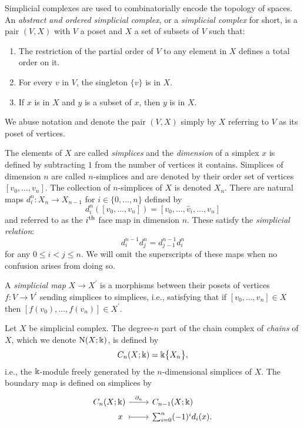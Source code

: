 Simplicial complexes are used to combinatorially encode the topology of spaces.
An \textit{abstract and ordered simplicial complex}, or a \textit{simplicial complex} for short, is a pair $(V, X)$ with $V$ a poset and $X$ a set of subsets of $V$ such that:
\begin{enumerate}
	\item The restriction of the partial order of $V$ to any element in $X$ defines a total order on it.
	\item For every $v$ in $V$, the singleton $\{v\}$ is in $X$.
	\item If $x$ is in $X$ and $y$ is a subset of $x$, then $y$ is in $X$.
\end{enumerate}
We abuse notation and denote the pair $(V, X)$ simply by $X$ referring to $V$ as its poset of vertices.

The elements of $X$ are called \textit{simplices} and the \textit{dimension} of a simplex $x$ is defined by subtracting $1$ from the number of vertices it contains.
Simplices of dimension $n$ are called $n$-simplices and are denoted by their order set of vertices $[v_0, \dots, v_n]$.
The collection of $n$-simplices of $X$ is denoted $X_n$.
There are natural maps $d_i^n \colon X_n \to X_{n-1}$ for $i \in \{0, \dots, n\}$ defined by
\begin{equation*}
d_i^n([v_0, \dots, v_n]) = [v_0, \dots, \widehat{v}_i, \dots, v_n]
\end{equation*}
and referred to as the $i^{\mathrm{th}}$ face map in dimension $n$.
These satisfy the \textit{simplicial relation}:
\begin{equation} \label{e:simplicial relation}
d_i^{n-1} d^n_j = d_{j-1}^{n-1} d_i^n
\end{equation}
for any $0 \leq i < j \leq n$.
We will omit the superscripts of these maps when no confusion arises from doing so.

A \textit{simplicial map} $X \to X^\prime$ is a morphisms between their posets of vertices $f \colon V \to V^\prime$ sending simplices to simplices, i.e., satisfying that if $[v_0, \dots, v_n] \in X$ then $[f(v_0), \dots, f(v_n)] \in X^\prime$.

Let $X$ be simplicial complex.
The degree-$n$ part of the chain complex of \textit{chains} of $X$, which we denote $\operatorname{N}(X; \Bbbk)$, is defined by
\begin{equation*}
C_n(X; \Bbbk) = \Bbbk \big\{ X_n \big\},
\end{equation*}
i.e., the $\Bbbk$-module freely generated by the $n$-dimensional simplices of $X$.
The boundary map is defined on simplices by
\begin{equation*}
\begin{tikzcd}[column sep=normal, row sep=tiny,row sep = 0ex
,/tikz/column 1/.append style={anchor=base east}
,/tikz/column 2/.append style={anchor=base west}
]
C_n(X; \k) \arrow[r, "\partial_n"] & C_{n-1}(X; \k) \\
x\ \arrow[r, |->] & \sum_{i=0}^{n} (-1)^i d_i (x).
\end{tikzcd}
\end{equation*}

